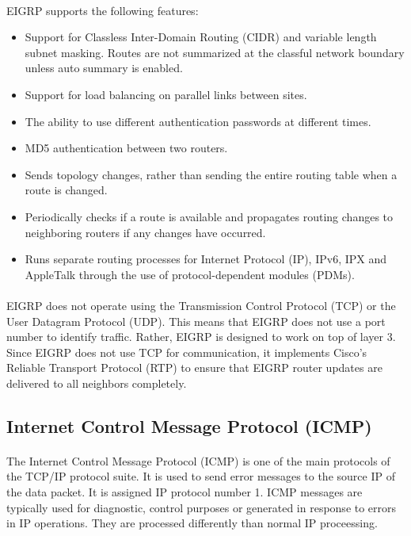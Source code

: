 \documentclass[12pt,a4paper]{report}
\begin{document}
\paragraph{}EIGRP supports the following features:
\begin{itemize}
	\item Support for Classless Inter-Domain Routing (CIDR) and variable length subnet masking. Routes are not summarized at the classful network boundary unless auto summary is enabled.
	\item Support for load balancing on parallel links between sites.
	\item The ability to use different authentication passwords at different times.
	\item MD5 authentication between two routers.
	\item Sends topology changes, rather than sending the entire routing table when a route is changed.
	\item Periodically checks if a route is available and propagates routing changes to neighboring routers if any changes have occurred.
	\item Runs separate routing processes for Internet Protocol (IP), IPv6, IPX and AppleTalk through the use of protocol-dependent modules (PDMs).
\end{itemize}
\paragraph{}EIGRP does not operate using the Transmission Control Protocol (TCP) or the User Datagram Protocol (UDP). This means that EIGRP does not use a port number to identify traffic. Rather, EIGRP is designed to work on top of layer 3. Since EIGRP does not use TCP for communication, it implements Cisco's Reliable Transport Protocol (RTP) to ensure that EIGRP router updates are delivered to all neighbors completely.

\subsection{Internet Control Message Protocol (ICMP)}
\paragraph{}The Internet Control Message Protocol (ICMP) is one of the main protocols of the TCP/IP protocol suite. It is used to send error messages to the source IP of the data packet. It is assigned IP protocol number 1. ICMP messages are typically used for diagnostic, control purposes or generated in response to errors in IP operations. They are processed differently than normal IP proceessing.
\end{document}
